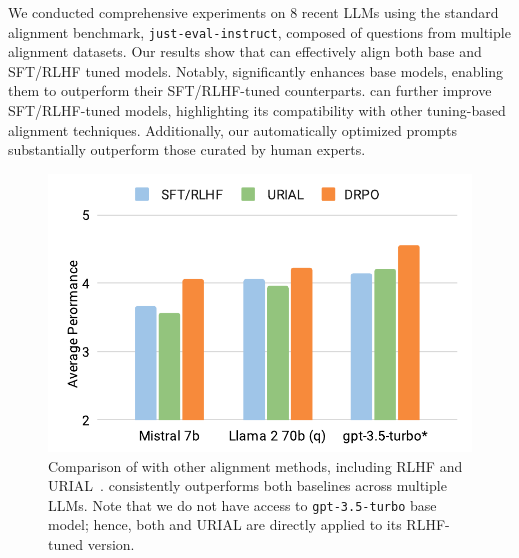 We conducted comprehensive experiments on 8 recent LLMs using the standard alignment benchmark, \texttt{just-eval-instruct}, composed of questions from multiple alignment datasets. Our results show that \ours can effectively align both base and SFT/RLHF tuned models. Notably, \ours significantly enhances base models, enabling them to outperform their SFT/RLHF-tuned counterparts. \ours can further improve SFT/RLHF-tuned models, highlighting its compatibility with other tuning-based alignment techniques. Additionally, our automatically optimized prompts substantially outperform those curated by human experts. 





\begin{figure}
    \centering
    \includegraphics[width=1.0\linewidth]{images/method_comparison_column_chart_white_bg.pdf}
    \vspace{-15pt}
    \caption{Comparison of \ours with other alignment methods, including RLHF and URIAL~\cite{Lin2024ReAlign}. \ours consistently outperforms both baselines across multiple LLMs.
    Note that we do not have access to \texttt{gpt-3.5-turbo} base model; hence, both \ours and URIAL are directly applied to its RLHF-tuned version.}
    \label{fig:overall_comparison_chart}
    \vspace{-15pt}
\end{figure}













